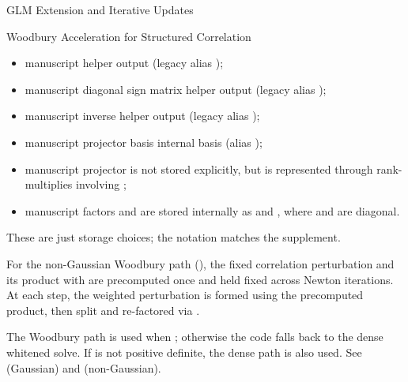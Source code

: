 \begin{Section}{GLM Extension and Iterative Updates}
\begin{SubSection}{Woodbury Acceleration for Structured Correlation}
\begin{itemize}
\item{} manuscript  \eqn{\leftrightarrow}{} helper output
 (legacy alias );
\item{} manuscript diagonal sign matrix 
\eqn{\leftrightarrow}{} helper output 
(legacy alias );
\item{} manuscript inverse
\eqn{\leftrightarrow}{} helper output 
(legacy alias );
\item{} manuscript projector basis 
\eqn{\leftrightarrow}{} internal basis 
(alias );
\item{} manuscript projector 
is not stored explicitly, but is represented through rank-
multiplies involving ;
\item{} manuscript factors  and
 are stored internally as
 and
,
where  and  are diagonal.

\end{itemize}

These are just storage choices; the notation matches the supplement.

For the non-Gaussian Woodbury path
(), the fixed correlation
perturbation  and its product with
 are precomputed once and held fixed
across Newton iterations. At each step, the weighted perturbation
 is formed using the
precomputed product, then split and re-factored via
.

The Woodbury path is used when ; otherwise the code falls
back to the dense whitened solve. If  is not positive
definite, the dense path is also used.
See  (Gaussian) and
 (non-Gaussian).
\end{SubSection}



\end{Section}
